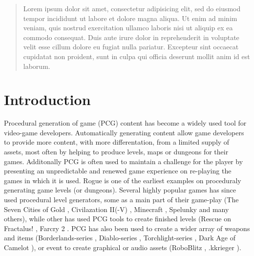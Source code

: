\documentclass[a4paper,titlepage,final]{report}
\begin{document}

\setcounter{page}{0}

\begin{spacing}{1.5}
\begin{abstract}
	Lorem ipsum dolor sit amet, consectetur adipisicing elit, sed do eiusmod tempor incididunt ut labore et dolore magna aliqua. Ut enim ad minim veniam, quis nostrud exercitation ullamco laboris nisi ut aliquip ex ea commodo consequat. Duis aute irure dolor in reprehenderit in voluptate velit esse cillum dolore eu fugiat nulla pariatur. Excepteur sint occaecat cupidatat non proident, sunt in culpa qui officia deserunt mollit anim id est laborum.
\end{abstract}
\end{spacing}

\tableofcontents
\newpage


\chapter{Introduction}
Procedural generation of game (PCG) content has become a widely used tool for video-game developers.
Automatically generating content allow game developers to provide more content, with more differentation, from a limited supply of assets, most often by helping to produce levels, maps or dungeons for their games. 
Additonally PCG is often used to maintain a challenge for the player by presenting an unpredictable and renewed game experience on re-playing the games in which it is used.
Rogue \citeyearpar{game:rogue} is one of the earliest examples on proceduraly generating game levels (or dungeons). Several highly popular games has since used procedural level generators, some as a main part of their game-play (The Seven Cities of Gold \citeyearpar{game:sevencities}, Civilazation II(-V) \citeyearpar{game:civilizationii}, Minecraft \citeyearpar{game:minecraft}, Spelunky \citeyearpar{game:spelunky} and many others), while other has used PCG tools to create finished levels (Rescue on Fractalus! \citeyearpar{game:rescurefractalus}, Farcry 2 \citeyearpar{game:farcry}.
PCG has also been used to create a wider array of weapons and items (Borderlands-series \citeyearpar{game:borderlandsseries}, Diablo-series \citeyearpar{game:diabloseries}, Torchlight-series \citeyearpar{game:diabloseries}, Dark Age of Camelot \citeyearpar{game:darkage}), or event to create graphical or audio assets (RoboBlitz \citeyearpar{game:RoboBlitz},  .kkrieger \citeyearpar{game:kkrieger}).
\end{document}
